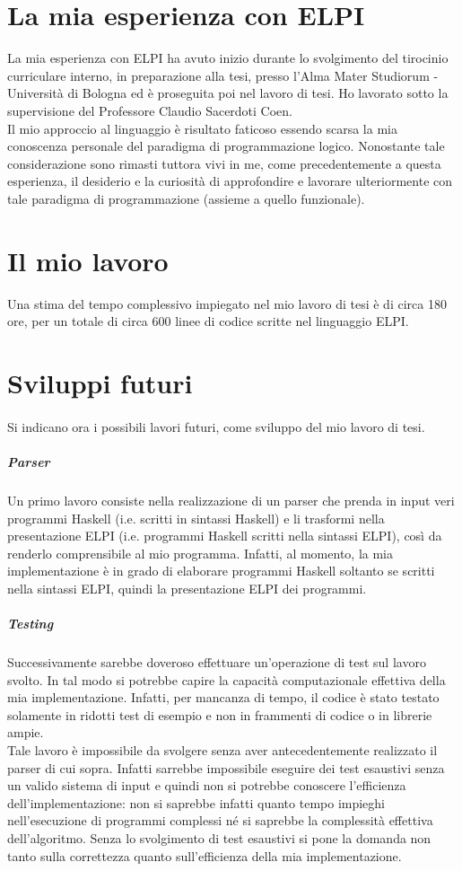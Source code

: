 \documentclass[12pt,a4paper,openright,twoside]{report}
\begin{document}
\section{La mia esperienza con ELPI}
La mia esperienza con ELPI ha avuto inizio durante lo svolgimento del tirocinio curriculare interno, in preparazione alla tesi, presso l'Alma Mater Studiorum - Università di Bologna ed è proseguita poi nel lavoro di tesi. Ho lavorato sotto la supervisione del Professore Claudio Sacerdoti Coen.\\
Il mio approccio al linguaggio è risultato faticoso essendo scarsa la mia conoscenza personale del paradigma di programmazione logico. Nonostante tale considerazione sono rimasti tuttora vivi in me, come precedentemente a questa esperienza, il desiderio e la curiosità di approfondire e lavorare ulteriormente con tale paradigma di programmazione (assieme a quello funzionale).

\section{Il mio lavoro}
Una stima del tempo complessivo impiegato nel mio lavoro di tesi è di circa 180 ore, per un totale di circa 600 linee di codice scritte nel linguaggio ELPI.

\section{Sviluppi futuri}

\paragraph{}
Si indicano ora i possibili lavori futuri, come sviluppo del mio lavoro di tesi.

\subparagraph{Parser}
Un primo lavoro consiste nella realizzazione di un parser che prenda in input veri programmi Haskell (i.e. scritti in sintassi Haskell) e li trasformi nella presentazione ELPI (i.e. programmi Haskell scritti nella sintassi ELPI), così da renderlo comprensibile al mio programma. Infatti, al momento, la mia implementazione è in grado di elaborare programmi Haskell soltanto se scritti nella sintassi ELPI, quindi la presentazione ELPI dei programmi.

\subparagraph{Testing}
Successivamente sarebbe doveroso effettuare un'operazione di test sul lavoro svolto. In tal modo si potrebbe capire la capacità computazionale effettiva della mia implementazione. Infatti, per mancanza di tempo, il codice è stato testato solamente in ridotti test di esempio e non in frammenti di codice o in librerie ampie.\\
Tale lavoro è impossibile da svolgere senza aver antecedentemente realizzato il parser di cui sopra. Infatti sarrebbe impossibile eseguire dei test esaustivi senza un valido sistema di input e quindi non si potrebbe conoscere l'efficienza dell'implementazione: non si saprebbe infatti quanto tempo impieghi nell'esecuzione di programmi complessi né si saprebbe la complessità effettiva dell'algoritmo. Senza lo svolgimento di test esaustivi si pone la domanda non tanto sulla correttezza quanto sull'efficienza della mia implementazione.
\end{document}
